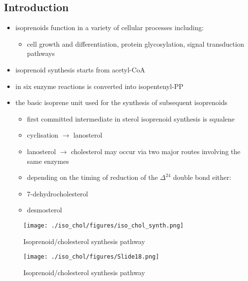 \documentclass{scrartcl}
\begin{document}
\subsection{Introduction}
\label{sec:org464b003}
\begin{itemize}
\item isoprenoids function in a variety of cellular processes including:
\begin{itemize}
\item cell growth and differentiation, protein glycosylation, signal
transduction pathways
\end{itemize}
\item isoprenoid synthesis starts from acetyl-CoA
\item in six enzyme reactions is converted into isopentenyl-PP
\item the basic isoprene unit used for the synthesis of subsequent
isoprenoids
\begin{itemize}
\item first committed intermediate in sterol isoprenoid synthesis is
squalene
\item cyclisation \(\to\) lanosterol
\item lanosterol \(\to\) cholesterol may occur via two major routes involving
the same enzymes
\item depending on the timing of reduction of the \(\Delta^{\text{24}}\) double bond either:
\item 7-dehydrocholesterol
\item desmosterol
\end{itemize}
\end{itemize}


\begin{figure}[htbp]
\centering
\texttt{[image: ./iso\_chol/figures/iso\_chol\_synth.png]}
\caption{\label{fig:org967bc6b}
Isoprenoid/cholesterol synthesis pathway}
\end{figure}

\begin{figure}[htbp]
\centering
\texttt{[image: ./iso\_chol/figures/Slide18.png]}
\caption{\label{fig:org4b02098}
Isoprenoid/cholesterol synthesis pathway}
\end{figure}
\end{document}
